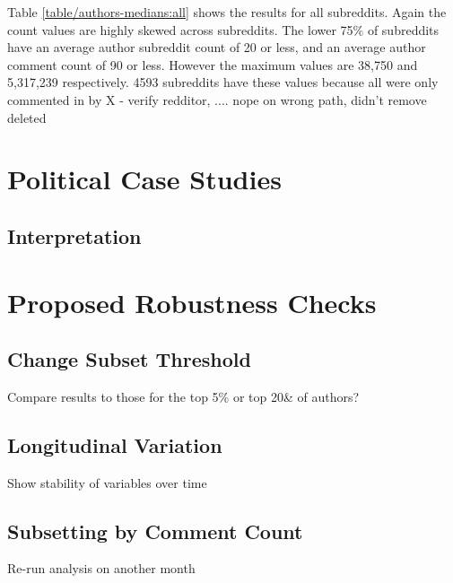 \documentclass{article}
\begin{document}
Table \ref{table/authors-medians:all} shows the results for all subreddits. Again the count values are highly skewed across subreddits. The lower 75\% of subreddits have an average author subreddit count of 20 or less, and an average author comment count of 90 or less. However the maximum values are 38,750 and 5,317,239 respectively. 4593 subreddits have these values because all were only commented in by {X - verify redditor, .... nope on wrong path, didn't remove deleted}






\section{Political Case Studies}


\subsection{Interpretation}

















\section{Proposed Robustness Checks}

\subsection{Change Subset Threshold}

Compare results to those for the top 5\% or top 20\& of authors?

\subsection{Longitudinal Variation}

Show stability of variables over time

\subsection{Subsetting by Comment Count}

Re-run analysis on another month
\end{document}
